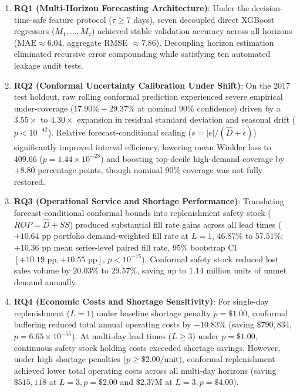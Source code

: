 \begin{enumerate}
    \item \textbf{RQ1 (Multi-Horizon Forecasting Architecture)}: Under the decision-time-safe feature protocol ($\tau \ge 7$ days), seven decoupled direct XGBoost regressors ($M_1, \dots, M_7$) achieved stable validation accuracy across all horizons ($\text{MAE} \approx 6.04$, aggregate RMSE $\approx 7.86$). Decoupling horizon estimation eliminated recursive error compounding while satisfying ten automated leakage audit tests.
    \item \textbf{RQ2 (Conformal Uncertainty Calibration Under Shift)}: On the 2017 test holdout, raw rolling conformal prediction experienced severe empirical under-coverage ($17.90\%-29.37\%$ at nominal $90\%$ confidence) driven by a $3.55\times$ to $4.30\times$ expansion in residual standard deviation and seasonal drift ($p < 10^{-42}$). Relative forecast-conditional scaling ($s = |e| / (\hat{D} + \epsilon)$) significantly improved interval efficiency, lowering mean Winkler loss to $409.66$ ($p = 1.44 \times 10^{-28}$) and boosting top-decile high-demand coverage by $+8.80$ percentage points, though nominal 90\% coverage was not fully restored.
    \item \textbf{RQ3 (Operational Service and Shortage Performance)}: Translating forecast-conditional conformal bounds into replenishment safety stock ($ROP = \hat{D} + SS$) produced substantial fill rate gains across all lead times ($+10.64\text{ pp}$ portfolio demand-weighted fill rate at $L=1$, $46.87\%$ to $57.51\%$; $+10.36\text{ pp}$ mean series-level paired fill rate, 95\% bootstrap CI $[+10.19\text{ pp}, +10.55\text{ pp}]$, $p < 10^{-75}$). Conformal safety stock reduced lost sales volume by $20.03\%$ to $29.57\%$, saving up to $1.14$ million units of unmet demand annually.
    \item \textbf{RQ4 (Economic Costs and Shortage Sensitivity)}: For single-day replenishment ($L=1$) under baseline shortage penalty $p=\$1.00$, conformal buffering reduced total annual operating costs by $-10.83\%$ (saving $\$790,834$, $p = 6.65 \times 10^{-55}$). At multi-day lead times ($L \ge 3$) under $p=\$1.00$, continuous safety stock holding costs exceeded shortage savings. However, under high shortage penalties ($p \ge \$2.00/\text{unit}$), conformal replenishment achieved lower total operating costs across all multi-day horizons (saving $\$515,118$ at $L=3, p=\$2.00$ and $\$2.37\text{M}$ at $L=3, p=\$4.00$).
\end{enumerate}

